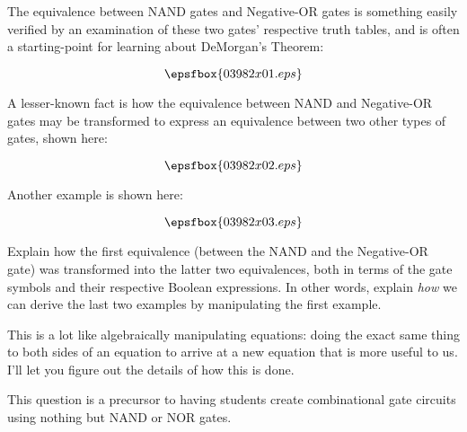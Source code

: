 

The equivalence between NAND gates and Negative-OR gates is something easily verified by an examination of these two gates' respective truth tables, and is often a starting-point for learning about DeMorgan's Theorem:

$$\epsfbox{03982x01.eps}$$

A lesser-known fact is how the equivalence between NAND and Negative-OR gates may be transformed to express an equivalence between two other types of gates, shown here:

$$\epsfbox{03982x02.eps}$$

Another example is shown here:

$$\epsfbox{03982x03.eps}$$

Explain how the first equivalence (between the NAND and the Negative-OR gate) was transformed into the latter two equivalences, both in terms of the gate symbols and their respective Boolean expressions.  In other words, explain {\it how} we can derive the last two examples by manipulating the first example.







This is a lot like algebraically manipulating equations: doing the exact same thing to both sides of an equation to arrive at a new equation that is more useful to us.  I'll let you figure out the details of how this is done.







This question is a precursor to having students create combinational gate circuits using nothing but NAND or NOR gates.




